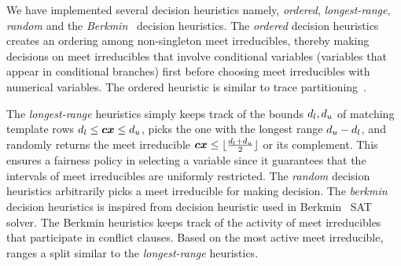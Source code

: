 
We have implemented several decision heuristics namely, {\em ordered}, 
{\em longest-range}, {\em random} and the 
{\em Berkmin}~\cite{eugoldberg07} decision heuristics.  
The {\em ordered} decision heuristics creates an ordering among non-singleton 
meet irreducibles, thereby making decisions on meet irreducibles that involve 
conditional variables (variables that appear in conditional branches) first 
before choosing meet irreducibles with numerical variables.  
The ordered heuristic is similar to trace partitioning~\cite{toplas07}.

The {\em longest-range} heuristics simply keeps track of the bounds
$d_l,d_u$ of matching template rows $d_l\leq
{\boldsymbol c}{\boldsymbol x}\leq d_u$, picks the one with the longest range
$d_u-d_l$, and randomly returns the meet irreducible
${\boldsymbol c}{\boldsymbol x}\leq
\lfloor\frac{d_l+d_u}{2}\rfloor$ or its
complement. This ensures a fairness policy in selecting a variable
since it guarantees that the intervals of meet irreducibles are
uniformly restricted.
%
The {\em random} decision heuristics arbitrarily picks a meet irreducible  
for making decision. 
%
%
The {\em berkmin} decision heuristics is inspired 
from decision heuristic used in Berkmin~\cite{eugoldberg07} SAT solver.  
The Berkmin heuristics %
keeps track of the activity of %
meet irreducibles that participate in conflict clauses. 
Based on the most active meet irreducible, ranges a split similar to the {\em longest-range} heuristics.
%
